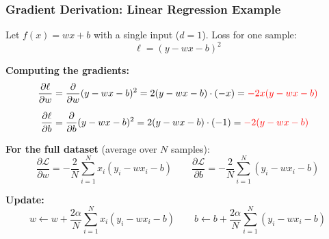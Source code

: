 \documentclass[notes,11pt, aspectratio=169]{beamer}
\begin{document}
\begin{frame}
\frametitle{Gradient Derivation: Linear Regression Example}

Let $f(x) = wx + b$ with a single input ($d=1$). Loss for one sample:
\[
    \ell = (y - wx - b)^2
\]

\textbf{Computing the gradients:}
\begin{align*}
    \frac{\partial \ell}{\partial w} &= \frac{\partial}{\partial w}(y - wx - b)^2 = 2(y - wx - b) \cdot (-x) = \textcolor{red}{-2x(y - wx - b)} \\[6pt]
    \frac{\partial \ell}{\partial b} &= \frac{\partial}{\partial b}(y - wx - b)^2 = 2(y - wx - b) \cdot (-1) = \textcolor{red}{-2(y - wx - b)}
\end{align*}

\textbf{For the full dataset} (average over $N$ samples):
\[
    \frac{\partial \mathcal{L}}{\partial w} = -\frac{2}{N}\sum_{i=1}^{N} x_i(y_i - wx_i - b) \qquad
    \frac{\partial \mathcal{L}}{\partial b} = -\frac{2}{N}\sum_{i=1}^{N} (y_i - wx_i - b)
\]

\textbf{Update:}
\[
    w \leftarrow w + \frac{2\alpha}{N}\sum_{i=1}^{N} x_i(y_i - wx_i - b) \qquad
    b \leftarrow b + \frac{2\alpha}{N}\sum_{i=1}^{N} (y_i - wx_i - b)
\]
\end{frame}
\end{document}
